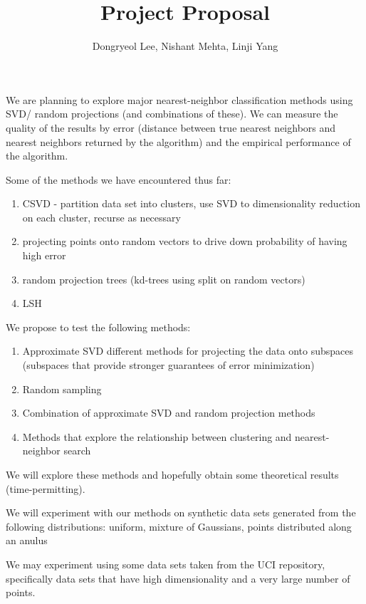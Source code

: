 \documentclass{article}
\begin{document}
\title{Project Proposal}

\author{Dongryeol Lee, Nishant Mehta, Linji Yang}

\maketitle



We are planning to explore major nearest-neighbor classification methods using SVD/ random projections (and combinations of these). We can measure the quality of the  results by error (distance between true nearest neighbors and nearest neighbors returned by the algorithm) and the empirical performance of the algorithm.

Some of the methods we have encountered thus far:

\begin{enumerate}
\item CSVD \cite{castelli2003cca} - partition data set into clusters, use SVD to dimensionality reduction on each cluster, recurse as necessary
\item projecting points onto random vectors \cite{kleinberg1997tan} to drive down probability of having high error
\item random projection trees (kd-trees using split on random vectors)
\item LSH \cite{indyk1997lph}
\end{enumerate}



We propose to test the following methods:
\begin{enumerate}
\item Approximate SVD
	different methods for projecting the data onto subspaces (subspaces that provide stronger guarantees of error minimization)
\item Random sampling 
\item Combination of approximate SVD and random projection methods
\item Methods that explore the relationship between clustering and nearest-neighbor search
\end{enumerate}

We will explore these methods and hopefully obtain some theoretical results (time-permitting).


We will experiment with our methods on synthetic data sets generated from the following distributions: uniform, mixture of Gaussians, points distributed along an anulus

We may experiment using some data sets taken from the UCI repository, specifically data sets that have high dimensionality and a very large number of points.



\end{document}
